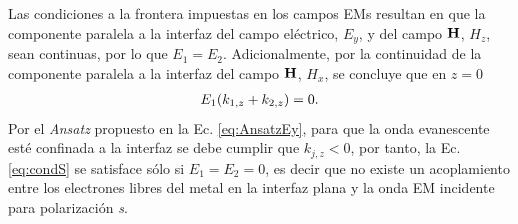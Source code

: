 \noindent   Las condiciones a la frontera impuestas en los campos EMs resultan en que la componente paralela a la interfaz del campo eléctrico, $E_y$, y del campo $\vb{H}$, $H_z$, sean continuas, por lo que $E_1 = E_2$. Adicionalmente, por la continuidad de la componente paralela a la interfaz del  campo $\vb{H}$, $H_x$, se concluye que en $z=0$
	\begin{align}
	E_1\qty(k_{1,z}+k_{2,z})= 0. \label{eq:condS}
	\end{align}
Por el \emph{Ansatz} propuesto en la Ec. \eqref{eq:AnsatzEy}, para que la onda evanescente esté confinada a la interfaz se debe cumplir que $k_{j,z}<0$, por tanto, la Ec. \eqref{eq:condS} se satisface sólo si $E_1 = E_2 = 0$, es decir  que no existe un acoplamiento entre los electrones libres del metal en la interfaz plana y la onda EM incidente para polarización \emph{s}.

